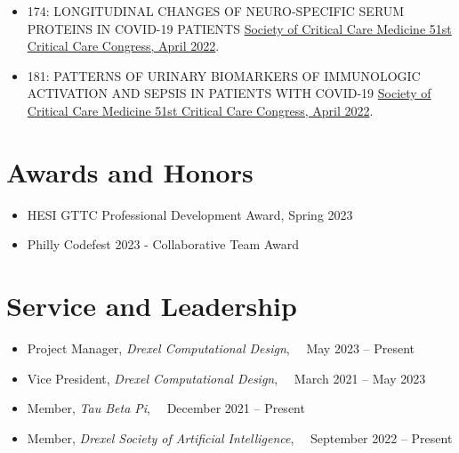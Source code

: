 \documentclass[letterpaper,11pt]{article}
\newcommand{\reusmeSubHeadingListSmallStart}{\begin{itemize}[itemsep=-4pt, parsep=4pt]}
\newcommand{\resumeSubHeadingListSmallEnd}{\end{itemize}}
\begin{document}
\reusmeSubHeadingListSmallStart
\item\small {
    174: LONGITUDINAL CHANGES OF NEURO-SPECIFIC SERUM PROTEINS IN COVID-19 PATIENTS
    \href{https://doi.org/10.1097/01.ccm.0000807020.73561.ed}
    {Society of Critical Care Medicine 51st Critical Care Congress, April 2022}.
}

\item\small {
    181: PATTERNS OF URINARY BIOMARKERS OF IMMUNOLOGIC ACTIVATION AND SEPSIS IN PATIENTS WITH COVID-19
    \href{https://doi.org/10.1097/01.ccm.0000807048.74105.59}
    {Society of Critical Care Medicine 51st Critical Care Congress, April 2022}.
}

\resumeSubHeadingListSmallEnd

\vspace{-20pt}


\section{Awards and Honors}
\reusmeSubHeadingListSmallStart
\item\small {
    HESI GTTC Professional Development Award, Spring 2023
}

\item\small {
    Philly Codefest 2023 - Collaborative Team Award
}

\resumeSubHeadingListSmallEnd

\vspace{-20pt}



\section{Service and Leadership}

\reusmeSubHeadingListSmallStart
\item\small {
    Project Manager, \emph{Drexel Computational Design}, ~~May 2023 -- Present
}
\item\small {
    Vice President, \emph{Drexel Computational Design}, ~~March 2021 -- May 2023 \\
}
\item\small {
    Member, \emph{Tau Beta Pi}, ~~December 2021 -- Present
}
\item\small {
    Member, \emph{Drexel Society of Artificial Intelligence}, ~~September 2022 -- Present
}
\resumeSubHeadingListSmallEnd
\end{document}
